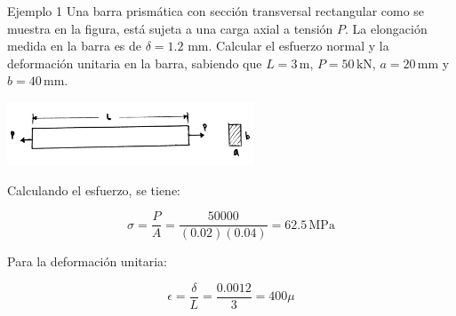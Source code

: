 \documentclass[12pt,letterpaper]{article}
\begin{document}
\begin{ejemplo}{Ejemplo 1}
Una barra prismática con sección transversal rectangular como se muestra en la figura, está sujeta a 
una carga axial a tensión $P$. La elongación medida en la barra es de $\delta = 1.2 \,\, \text{mm}$. 
Calcular el esfuerzo normal y la deformación unitaria en la barra, sabiendo que $L = 3\,\text{m} $, 
$P = 50 \, \text{kN}$, $a=20 \, \text{mm}$ y $b=40 \, \text{mm}$.

\begin{center}
\includegraphics[width=0.55\textwidth]{img/ejemplo_01.jpg}
\end{center}

Calculando el esfuerzo, se tiene:

$$ \sigma = \frac{P}{A} = \frac{50 000}{(0.02)(0.04)} = 62.5 \, \text{MPa} $$

Para la deformación unitaria:

$$ \epsilon = \frac{\delta}{L} = \frac{0.0012}{3} = 400 \mu $$

\end{ejemplo}
\end{document}
